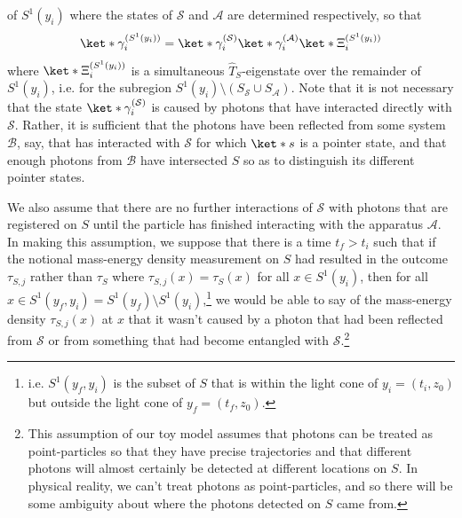 \documentclass[12pt]{report}
\begin{document}
  of $S^1(y_i)$ where the states of $\mathcal{S}$ and $\mathcal{A}$ are determined respectively, so that 
\begin{equation}\label{gammadecomp}
\ket*{\gamma^{(S^1(y_i))}_i}=\ket*{\gamma^{(\mathcal{S})}_i}\ket*{\gamma^{(\mathcal{A})}_i}\ket*{\Xi^{(S^1(y_i))}_i}
\end{equation}
where $\ket*{\Xi^{(S^1(y_i))}_i}$ is a simultaneous $\hat{T}_S$-eigenstate over the remainder of $S^1(y_i)$, i.e. for the subregion $S^1(y_i)\setminus(S_{\mathcal{S}}\cup S_{\mathcal{A}})$.
%
%
 Note that it is not necessary that the state $\ket*{\gamma^{(\mathcal{S})}_i}$ is caused by photons that have interacted directly with $\mathcal{S}$. Rather, it is sufficient that the photons have been reflected from some system $\mathcal{B}$, say, that has interacted with $\mathcal{S}$ for which $\ket*{s}$ is a pointer state, and that enough photons from $\mathcal{B}$ have intersected $S$ so as to distinguish its different pointer states. 

We also assume that there are no further interactions of $\mathcal{S}$ with photons that are registered on $S$ until the particle has finished interacting with the apparatus $\mathcal{A}$.  In making this assumption, we suppose that there is a time $t_f>t_i$	%
 such that if the notional mass-energy density measurement on $S$ had resulted in the outcome $\tau_{S,j}$ rather than $\tau_S$ where $\tau_{S,j}(x)=\tau_S(x)$ for all $x\in S^1(y_i)$, then for all $x \in S^1(y_f,y_i)=S^1(y_f)\setminus S^1(y_i)$,\footnote{i.e. $S^1(y_f,y_i)$ is the subset of $S$ that is within the light cone of $y_i=(t_i, z_0)$ but outside the light cone of $y_f=(t_f, z_0)$.}  %
%
we would be able to say of the mass-energy density $\tau_{S,j}(x)$ at $x$ that it wasn't caused by a photon that had been reflected from $\mathcal{S}$ or from something that had become entangled with $\mathcal{S}$.\footnote{This assumption of our toy model assumes that photons can be treated as point-particles so that they have precise trajectories and that different photons will almost certainly be detected at different locations on $S$. In physical reality, we can't treat photons as point-particles, and so there will be some ambiguity about where the photons detected on $S$ came from.}
\end{document}

